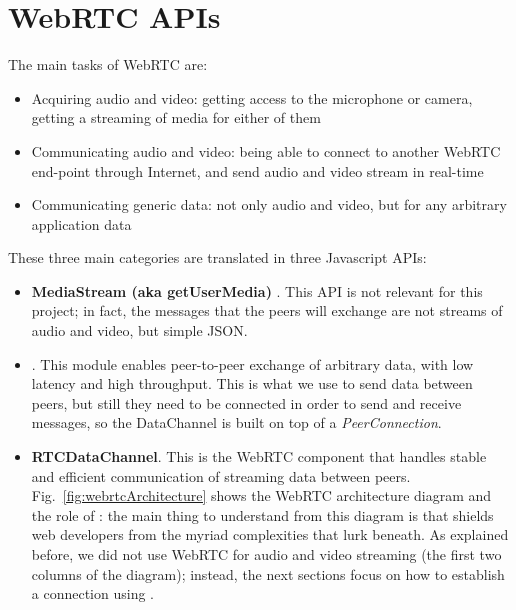 \section{WebRTC APIs}
\label{sec:webrtc_api}
The main tasks of WebRTC are:
\begin{itemize}
	\item Acquiring audio and video: getting access to the microphone or camera, getting a streaming of media for either of them
	\item Communicating audio and video: being able to connect to another WebRTC end-point through Internet, and send audio and video stream in real-time
	\item Communicating generic data: not only audio and video, but for any arbitrary application data
\end{itemize}
These three main categories are translated in three Javascript APIs:
\begin{itemize}
	\item\textbf{MediaStream (aka getUserMedia) }.
This API is not relevant for this project; in fact, the messages that the peers will exchange are not streams of audio and video, but simple JSON.
	\item\textbf{\RTCPeerConnection}.
This module enables peer-to-peer exchange of arbitrary data, with low latency and high throughput. This is what we use to send data between peers, but still they need to be connected in order to send and receive messages, so the DataChannel is built on top of a \textit{PeerConnection}.
	\item\textbf{RTCDataChannel}.
This is the WebRTC component that handles stable and efficient communication of streaming data between peers. Fig.~\ref{fig:webrtcArchitecture} shows the WebRTC architecture diagram and the role of \RTCPeerConnection: the main thing to understand from this diagram is that \RTCPeerConnection shields web developers from the myriad complexities that lurk beneath. As explained before, we did not use WebRTC for audio and video streaming (the first two columns of the diagram); instead, the next sections focus on how to establish a connection using \RTCPeerConnection.
\end{itemize}

